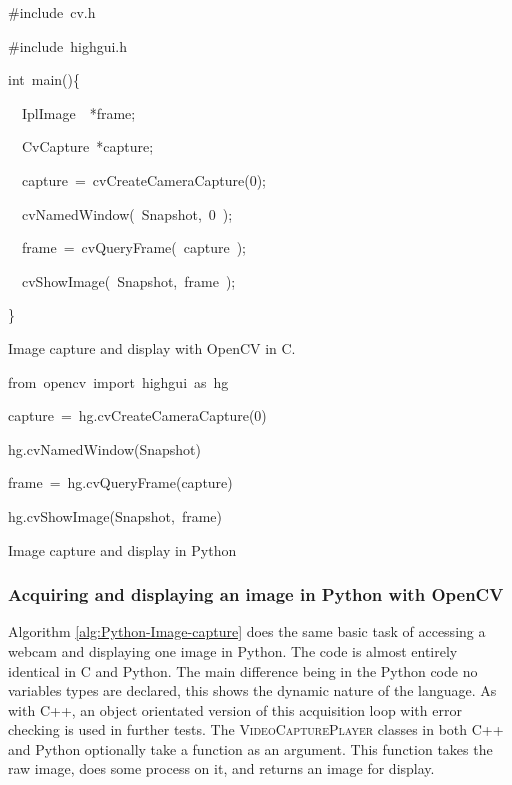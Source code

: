 \documentclass[english]{IEEEtran}
\newcommand{\noun}[1]{\textsc{#1}}
\theoremstyle{plain}
\newenvironment{lyxcode}
{\par\begin{list}{}{
\setlength{\rightmargin}{\leftmargin}
\setlength{\listparindent}{0pt}%
\raggedright
\setlength{\itemsep}{0pt}
\setlength{\parsep}{0pt}
\normalfont\ttfamily}%
 \item[]}
{\end{list}}
\begin{document}
%
\begin{algorithm}[h]
\begin{lyxcode}
\#include~\textquotedbl{}cv.h\textquotedbl{}

\#include~\textquotedbl{}highgui.h\textquotedbl{}

int~main()\{

~~IplImage~~{*}frame;

~~CvCapture~{*}capture;

~~capture~=~cvCreateCameraCapture(0);

~~cvNamedWindow(~\textquotedbl{}Snapshot\textquotedbl{},~0~);

~~frame~=~cvQueryFrame(~capture~);

~~cvShowImage(~\textquotedbl{}Snapshot\textquotedbl{},~frame~);

\}
\end{lyxcode}
\caption{\label{alg:C-Image-capture}Image capture and display with OpenCV
in C. }

\end{algorithm}

%
\begin{algorithm}[h]
\begin{lyxcode}
from~opencv~import~highgui~as~hg

capture~=~hg.cvCreateCameraCapture(0)

hg.cvNamedWindow(\textquotedbl{}Snapshot\textquotedbl{})

frame~=~hg.cvQueryFrame(capture)

hg.cvShowImage(\textquotedbl{}Snapshot\textquotedbl{},~frame)
\end{lyxcode}
\caption{\label{alg:Python-Image-capture}Image capture and display in Python}

\end{algorithm}


\subsubsection{Acquiring and displaying an image in Python with OpenCV}

Algorithm \ref{alg:Python-Image-capture} does the same basic task
of accessing a webcam and displaying one image in Python. The code
is almost entirely identical in C and Python. The main difference
being in the Python code no variables types are declared, this shows
the dynamic nature of the language. As with C++, an object orientated
version of this acquisition loop with error checking is used in further
tests. The \noun{VideoCapturePlayer} classes in both C++ and Python
optionally take a function as an argument. This function takes the
raw image, does some process on it, and returns an image for display. 
\end{document}
